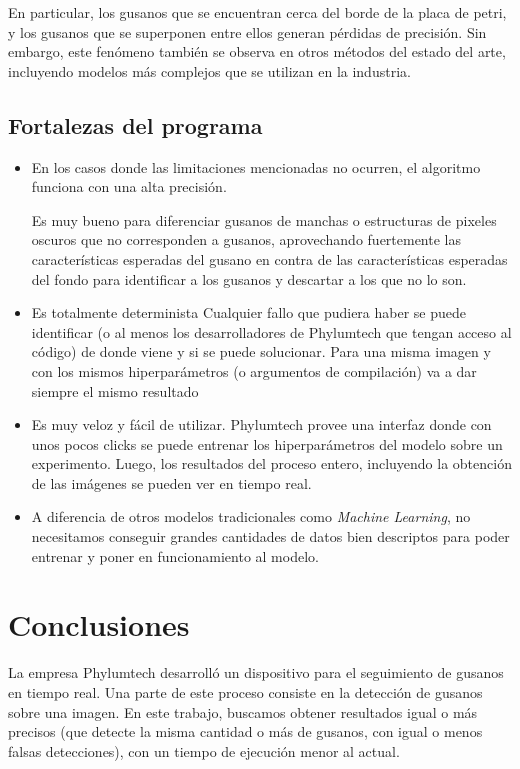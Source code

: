 \documentclass{article}
\begin{document}
En particular, los gusanos que se encuentran cerca del borde de la placa de petri, y los gusanos que se superponen entre ellos generan pérdidas de precisión. Sin embargo, este fenómeno también se observa en otros métodos del estado del arte, incluyendo modelos más complejos que se utilizan en la industria. %

\subsection{Fortalezas del programa}
\begin{itemize}
\item En los casos donde las limitaciones mencionadas no ocurren, el algoritmo funciona con una alta precisión.

\hspace{0.2cm} Es muy bueno para diferenciar gusanos de manchas o estructuras de pixeles oscuros que no corresponden a gusanos, aprovechando fuertemente las características esperadas del gusano en contra de las características esperadas del fondo para identificar a los gusanos y descartar a los que no lo son.

\item Es totalmente determinista Cualquier fallo que pudiera haber se puede identificar (o al menos los desarrolladores de Phylumtech que tengan acceso al código) de donde viene y si se puede solucionar. Para una misma imagen y con los mismos hiperparámetros (o argumentos de compilación) va a dar siempre el mismo resultado

\item Es muy veloz y fácil de utilizar. Phylumtech provee una interfaz donde con unos pocos clicks se puede entrenar los hiperparámetros del modelo sobre un experimento. Luego, los resultados del proceso entero, incluyendo la obtención de las imágenes se pueden ver en tiempo real.

\item A diferencia de otros modelos tradicionales como \emph{Machine Learning}, no necesitamos conseguir grandes cantidades de datos bien descriptos para poder entrenar y poner en funcionamiento al modelo.
\end{itemize}

\section{Conclusiones}
\lhead{}
La empresa Phylumtech desarrolló un dispositivo para el seguimiento de gusanos en tiempo real. Una parte de este proceso consiste en la detección de gusanos sobre una imagen. En este trabajo, buscamos obtener resultados igual o más precisos (que detecte la misma cantidad o más de gusanos, con igual o menos falsas detecciones), con un tiempo de ejecución menor al actual.
\end{document}
